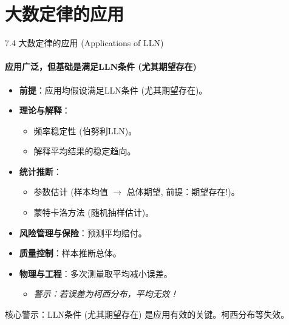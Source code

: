 \documentclass[UTF8]{beamer}
\begin{document}
\section{大数定律的应用}
\begin{frame}[shrink=15]{7.4 大数定律的应用 (Applications of LLN)}
    \framesubtitle{应用广泛，但基础是满足LLN条件 (尤其期望存在)}
    \begin{itemize}
        \item \textbf{前提}：应用均假设满足LLN条件 (尤其\alert{期望存在})。
        \item \textbf{理论与解释}：
            \begin{itemize}
                \item \alert{频率稳定性} (伯努利LLN)。
                \item 解释平均结果的稳定趋向。
            \end{itemize}
        \item \textbf{统计推断}：
            \begin{itemize}
                \item \alert{参数估计} (样本均值 $\rightarrow$ 总体期望, \alert{前提：期望存在!})。
                \item \alert{蒙特卡洛方法} (随机抽样估计)。
            \end{itemize}
        \item \textbf{风险管理与保险}：预测平均赔付。
        \item \textbf{质量控制}：样本推断总体。
        \item \textbf{物理与工程}：多次测量取平均减小误差。
            \begin{itemize}
                \item \textit{警示：若误差为柯西分布，平均\alert{无效}！} 
            \end{itemize}
    \end{itemize}
    \vspace{0.2cm}
    \alert{核心警示}：LLN条件 (尤其期望存在) 是应用有效的关键。柯西分布等失效。
\end{frame}
\end{document}
